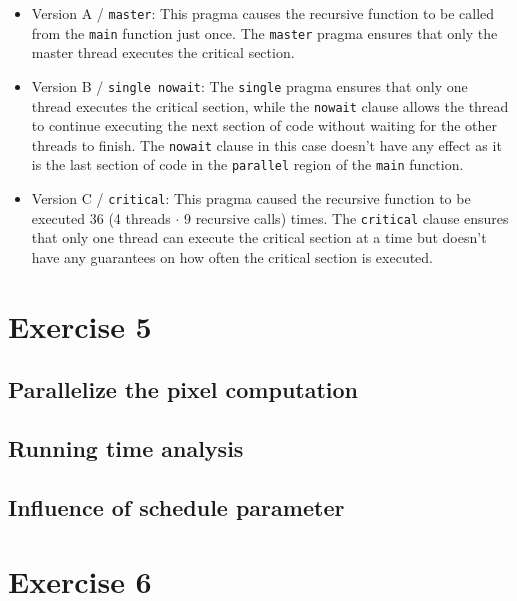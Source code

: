 \documentclass[a4paper,%
7pt,%
DIV12,
headsepline,%
headings=normal,
]{scrartcl}
\begin{document}
\begin{itemize}

    \item Version A / \texttt{master}: This pragma causes the recursive function to be called from the \texttt{main} function just once. The \texttt{master} pragma ensures that only the master thread executes the critical section.

    \item Version B / \texttt{single nowait}: The \texttt{single} pragma ensures that only one thread executes the critical section, while the \texttt{nowait} clause allows the thread to continue executing the next section of code without waiting for the other threads to finish. The \texttt{nowait} clause in this case doesn't have any effect as it is the last section of code in the \texttt{parallel} region of the \texttt{main} function.
    
    \item Version C / \texttt{critical}: This pragma caused the recursive function to be executed 36 (4 threads $\cdot$ 9 recursive calls) times. The \texttt{critical} clause ensures that only one thread can execute the critical section at a time but doesn't have any guarantees on how often the critical section is executed.

\end{itemize}

\section{Exercise 5}

\subsection{Parallelize the pixel computation}

\subsection{Running time analysis}

\subsection{Influence of schedule parameter}

\section{Exercise 6}
\end{document}
